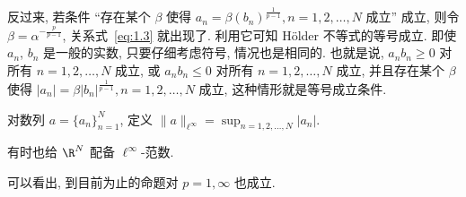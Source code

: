 反过来, 若条件 ``存在某个 $\beta$ 使得 $a_{n} = \beta(b_{n})^{\frac{1}{p-1}}, n = 1, 2, \ldots, N$ 成立'' 成立, 则令 $\beta = \alpha^{-\frac{p}{p-1}}$, 关系式~\eqref{eq:1.3} 就出现了. 利用它可知 Hölder 不等式的等号成立. 即使 $a_{n}$, $b_{n}$ 是一般的实数, 只要仔细考虑符号, 情况也是相同的. 也就是说, $a_{n}b_{n} \geq 0$ 对所有 $n = 1, 2, \ldots, N$ 成立, 或 $a_{n}b_{n} \leq 0$ 对所有 $n = 1, 2, \ldots, N$ 成立, 并且存在某个 $\beta$ 使得 $|a_{n}| = \beta|b_{n}|^{\frac{1}{p-1}}, n = 1, 2, \ldots, N$ 成立, 这种情形就是等号成立条件.

\begin{definition}\label{def:1.2}
对数列 $a = \{a_{n}\}_{n=1}^{N}$, 定义 $\|a\|_{\ell^{\infty}} = \sup_{n = 1, 2, \ldots, N} |a_{n}|$.
\end{definition}

有时也给 $\R^{N}$ 配备 $\ell^{\infty}$-范数.

可以看出, 到目前为止的命题对 $p = 1, \infty$ 也成立.


